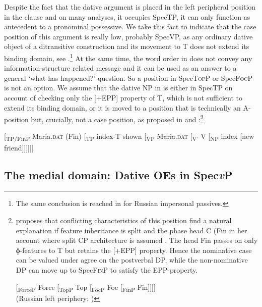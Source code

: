 \documentclass[output=paper,modfonts,nonflat
]{langsci/langscibook}
\begin{document}
\noindent Despite the fact that the dative argument is placed in the left peripheral position in the clause and on many analyses, it occupies SpecTP, it can only function as antecedent to a pronominal possessive. We take this fact to indicate that the case position of this argument is really low, probably SpecVP, as any ordinary dative object of a ditransitive construction and its movement to T does not extend its binding domain, see .\footnote{\label{fn21}The same conclusion is reached in \cite{mooreperlmutter2000} for Russian impersonal passives.} At the same time, the word order in  does not convey any information-structure related message and it can be used as an answer to a general ‘what has happened?’ question. So a position in Spec\textsc{Top}P or Spec\textsc{Foc}P is not an option. We assume that the dative NP in  is either in SpecTP on account of checking only the [+EPP] property of T, which is not sufficient to extend its binding domain, or it is moved to a position that is technically an A-position but, crucially, not a case position, as proposed in \cite{germain2015} and \cite{citkoetal2018}:\footnote{\label{fn22}\cite{germain2015} proposes that conflicting characteristics of this position find a natural explanation if feature inheritance is split and the phase head C (Fin in her account where  split CP architecture is assumed . The head Fin passes on only ɸ-features to T but retains the [+EPP] property. Hence the nominative case can be valued under agree on the postverbal DP, while the non-nominative DP can move up to Spec\textsc{Fin}P to satisfy the EPP-property.

\ea\label{split_cp_rus}
{[\textsubscript{ForceP} Force [\textsubscript{TopP} Top [\textsubscript{FocP} Foc [\textsubscript{FinP} Fin]]]]}\\
\xspace\hfill (Russian left periphery; \citealt[428]{germain2015})
\z
}

\ea \label{ex:witkos:33}
{[\textsubscript{TP/FinP} Maria.\textsc{dat} (Fin) [\textsubscript{TP} index-T shown [\textsubscript{VP} \sout{Maria}.\textsc{dat} [\textsubscript{V’} V [\textsubscript{NP} index [new friend]]]]]]}\\
\z

\subsection{The medial domain: Dative OEs in Spec\textit{v}P}\label{s3.2}
\end{document}
